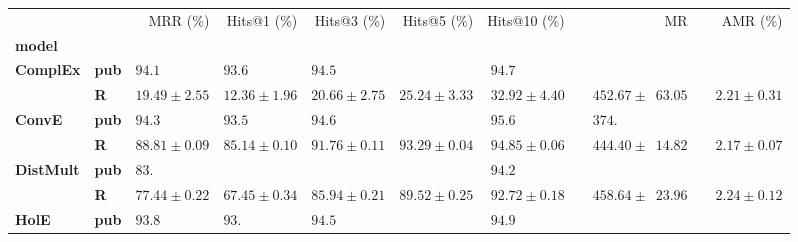 \begin{tabular}{llrrrrrrr}
\toprule
       &   &                    MRR (\%) &                 Hits@1 (\%) &                 Hits@3 (\%) &                 Hits@5 (\%) &                Hits@10 (\%) &                                         MR &                     AMR (\%) \\
\textbf{model} & {} &                             &                             &                             &                             &                             &                                            &                              \\
\midrule
\textbf{ComplEx} & \textbf{pub} &  $94.1\phantom{0 \pm 0.00}$ &  $93.6\phantom{0 \pm 0.00}$ &  $94.5\phantom{0 \pm 0.00}$ &                             &  $94.7\phantom{0 \pm 0.00}$ &                                            &                              \\
       & \textbf{R} &            $19.49 \pm 2.55$ &            $12.36 \pm 1.96$ &            $20.66 \pm 2.75$ &            $25.24 \pm 3.33$ &            $32.92 \pm 4.40$ &  $\phantom{00}452.67 \pm \phantom{0}63.05$ &  $\phantom{00}2.21 \pm 0.31$ \\\midrule
\textbf{ConvE} & \textbf{pub} &  $94.3\phantom{0 \pm 0.00}$ &  $93.5\phantom{0 \pm 0.00}$ &  $94.6\phantom{0 \pm 0.00}$ &                             &  $95.6\phantom{0 \pm 0.00}$ &  $\phantom{00}374.\phantom{00 \pm 000.00}$ &                              \\
       & \textbf{R} &            $88.81 \pm 0.09$ &            $85.14 \pm 0.10$ &            $91.76 \pm 0.11$ &            $93.29 \pm 0.04$ &            $94.85 \pm 0.06$ &  $\phantom{00}444.40 \pm \phantom{0}14.82$ &  $\phantom{00}2.17 \pm 0.07$ \\\midrule
\textbf{DistMult} & \textbf{pub} &  $83.\phantom{00 \pm 0.00}$ &                             &                             &                             &  $94.2\phantom{0 \pm 0.00}$ &                                            &                              \\
       & \textbf{R} &            $77.44 \pm 0.22$ &            $67.45 \pm 0.34$ &            $85.94 \pm 0.21$ &            $89.52 \pm 0.25$ &            $92.72 \pm 0.18$ &  $\phantom{00}458.64 \pm \phantom{0}23.96$ &  $\phantom{00}2.24 \pm 0.12$ \\\midrule
\textbf{HolE} & \textbf{pub} &  $93.8\phantom{0 \pm 0.00}$ &  $93.\phantom{00 \pm 0.00}$ &  $94.5\phantom{0 \pm 0.00}$ &                             &  $94.9\phantom{0 \pm 0.00}$ &                                            &                              \\

\end{tabular}
